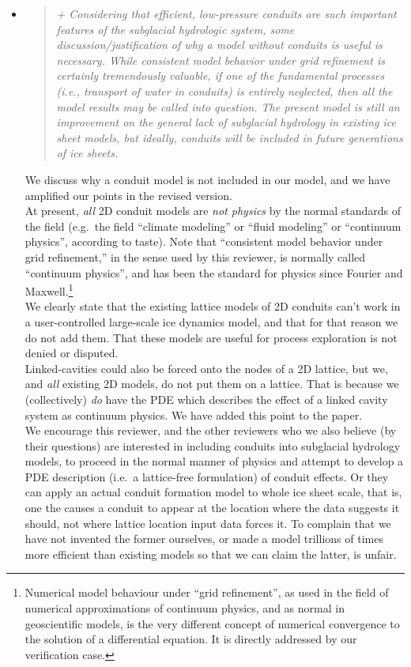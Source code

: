 \documentclass[11pt,reqno]{amsart}
\newcommand{\reply}[2]{
\medskip\medskip
\item  \begin{quote}
\emph{#1}
\end{quote}

\medskip
\noindent #2}
\begin{document}
\begin{itemize}
\reply{+ Considering that efficient, low-pressure conduits are such important features of the subglacial hydrologic system, some discussion/justification of why a model without conduits is useful is necessary.  While consistent model behavior under grid refinement is certainly tremendously valuable, if one of the fundamental processes (i.e., transport of water in conduits) is entirely neglected, then all the model results may be called into question.  The present model is still an improvement on the general lack of subglacial hydrology in existing ice sheet models, but ideally, conduits will be included in future generations of ice sheets.}
{We discuss why a conduit model is not included in our model, and we have amplified our points in the revised version.\\
\indent  At present, \emph{all} 2D conduit models are \emph{not physics} by the normal standards of the field (e.g.~the field ``climate modeling'' or ``fluid modeling'' or ``continuum physics'', according to taste).  Note that ``consistent model behavior under grid refinement,'' in the sense used by this reviewer, is normally called ``continuum physics'', and has been the standard for physics since Fourier and Maxwell.\footnote{Numerical model behaviour under ``grid refinement'', as used in the field of numerical approximations of continuum physics, and as normal in geoscientific models, is the very different concept of numerical convergence to the solution of a differential equation.  It is directly addressed by our verification case.} \\
\indent We clearly state that the existing lattice models of 2D conduits can't work in a user-controlled large-scale ice dynamics model, and that for that reason we do not add them.  That these models are useful for process exploration is not denied or disputed.\\
\indent Linked-cavities could also be forced onto the nodes of a 2D lattice, but we, and \emph{all} existing 2D models, do not put them on a lattice.  That is because we (collectively) \emph{do} have the PDE which describes the effect of a linked cavity system as continuum physics.  We have added this point to the paper. \\
\indent We encourage this reviewer, and the other reviewers who we also believe (by their questions) are interested in including conduits into subglacial hydrology models, to proceed in the normal manner of physics and attempt to develop a PDE description (i.e.~a lattice-free formulation) of conduit effects.  Or they can apply an actual conduit formation model to whole ice sheet scale, that is, one the causes a conduit to appear at the location where the data suggests it should, not where lattice location input data forces it.  To complain that we have not invented the former ourselves, or made a model trillions of times more efficient than existing models so that we can claim the latter, is unfair.\\
}
\end{itemize}
\end{document}
